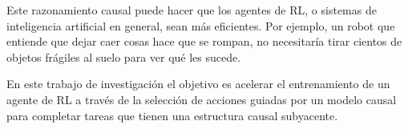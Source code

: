         
    






Este razonamiento causal puede hacer 
que los agentes de RL, o sistemas de inteligencia artificial en general, 
sean más eficientes.
Por ejemplo, un robot que entiende que dejar caer cosas hace que se rompan, no necesitaría tirar cientos de objetos frágiles al suelo para ver qué les sucede.





En este trabajo de investigación el objetivo es 
acelerar el entrenamiento de un agente de RL
a través de la selección de acciones guiadas por un 
modelo causal para completar tareas que tienen una
estructura causal subyacente.


